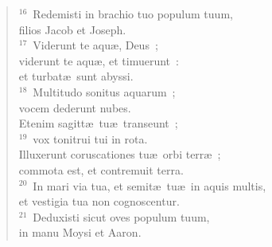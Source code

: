 \begin{flushleft}
\begin{verse}
${}^{16}$~Redemisti in brachio tuo populum tuum,\\ filios Jacob et Joseph.\\
${}^{17}$~Viderunt te aqu\ae , Deus~;\\ viderunt te aqu\ae , et timuerunt~:\\ et turbat\ae\ sunt abyssi.\\
${}^{18}$~Multitudo sonitus aquarum~;\\ vocem dederunt nubes.\\ Etenim sagitt\ae\ tu\ae\ transeunt~;\\
${}^{19}$~vox tonitrui tui in rota.\\ Illuxerunt coruscationes tu\ae\ orbi terr\ae~;\\ commota est, et contremuit terra.\\
${}^{20}$~In mari via tua, et semit\ae\ tu\ae\ in aquis multis,\\ et vestigia tua non cognoscentur.\\
${}^{21}$~Deduxisti sicut oves populum tuum,\\ in manu Moysi et Aaron.\end{verse}\end{flushleft}



